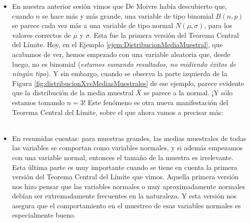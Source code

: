 \begin{itemize}
    \item En nuestra anterior sesión vimos que De Moivre había descubierto que, cuando $n$ se hace más y más grande, una variable de tipo binomial $B(n,p)$ se parece cada vez más a una variable de tipo normal $N(\mu, \sigma)$, para los valores correctos de $\mu$ y $\sigma$. Esta fue la primera versión del Teorema Central del Límite. Hoy, en el Ejemplo \ref{ejem:DistribucionMediaMuestral}, que acabamos de ver, hemos empezado con una variable aleatoria que, desde luego, no es binomial ({\em estamos sumando resultados, no midiendo éxitos de ningún tipo}). Y sin embargo, cuando se observa la parte izquierda de la Figura \ref{fig:distribucionXvsMediasMuestrales} de ese ejemplo, parece evidente que la distribución de la media muestral $\bar X$ se parece a la normal. ¡Y sólo estamos tomando $n=3$! Este fenómeno es otra nueva manifestación del Teorema Central del Límite, sobre el que ahora vamos a precisar más:\\[3mm]
       \\[3mm]
       \item En resumidas cuentas: para muestras grandes, las medias muestrales de todas las variables se comportan como variables normales, y si además empezamos con una variable normal, entonces el tamaño de la muestra es irrelevante. Esta última parte es muy importante cuando se tiene en cuenta la primera versión del Teorema Central del Límite que vimos. Aquella primera versión nos hizo pensar que las variables normales o muy aproximadamente normales debían ser extremadamente frecuentes en la naturaleza. Y esta versión nos asegura que el comportamiento en el muestreo de esas variables normales es especialmente bueno.


\end{itemize}
